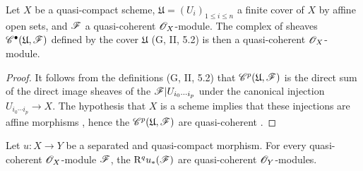 \begin{lemma}[1.4.9]
\label{III.1.4.9}
Let $X$ be a quasi-compact scheme, $\mathfrak{U}=(U_i)_{1\leq i\leq n}$ a finite cover of $X$ by affine open sets, and $\mathscr{F}$ a quasi-coherent $\mathscr{O}_X$-module.
The complex of sheaves $\mathscr{C}^\bullet(\mathfrak{U},\mathscr{F})$ defined by the cover $\mathfrak{U}$ (G, II, 5.2) is then a quasi-coherent $\mathscr{O}_X$-module.
\end{lemma}

\begin{proof}
It follows from the definitions (G, II, 5.2) that $\mathscr{C}^p(\mathfrak{U},\mathscr{F})$ is the direct sum of the direct image sheaves of the $\mathscr{F}|U_{i_0\cdots i_p}$ under the canonical injection $U_{i_0\cdots i_p}\to X$.
The hypothesis that $X$ is a scheme implies that these injections are affine morphisms , hence the $\mathscr{C}^p(\mathfrak{U},\mathscr{F})$ are quasi-coherent .
\end{proof}

\begin{proposition}[1.4.10]
\label{III.1.4.10}
Let $u:X\to Y$ be a separated and quasi-compact morphism.
For every quasi-coherent $\mathscr{O}_X$-module $\mathscr{F}$, the $\mathrm{R}^q u_*(\mathscr{F})$ are quasi-coherent $\mathscr{O}_Y$-modules.
\end{proposition}


